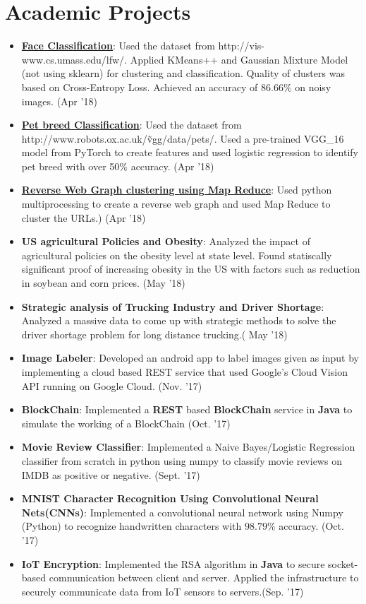 \documentclass[letterpaper,10.8pt]{article}
\newcommand{\resumeItem}[2]{
  \item\small{
    \textbf{#1}{: #2 \vspace{-2pt}}
  }
}
\newcommand{\resumeSubItem}[2]{\resumeItem{#1}{#2}\vspace{-4pt}}
\newcommand{\resumeSubHeadingListStart}{\begin{itemize}[leftmargin=*]}
\newcommand{\resumeSubHeadingListEnd}{\end{itemize}}
\begin{document}
\section{Academic Projects}
\resumeSubHeadingListStart
\resumeSubItem{\href{https://github.com/ramanujam/DataSciecne/tree/master/homework5}{Face Classification}}{Used the dataset from {http://vis-www.cs.umass.edu/lfw/}. Applied KMeans++ and Gaussian Mixture Model (not using sklearn) for clustering and classification. Quality of clusters was based on Cross-Entropy Loss. Achieved an accuracy of 86.66\% on noisy images. (Apr '18)}
\resumeSubItem{\href{https://github.com/ramanujam/DataSciecne/blob/master/homework5/deep_learning.ipynb}{Pet breed Classification}}{Used the dataset from {http://www.robots.ox.ac.uk/\~vgg/data/pets/}. Used a pre-trained VGG\_16 model from PyTorch to create features and used logistic regression to identify pet breed with over 50\% accuracy.  (Apr '18)}
\resumeSubItem{\href{https://github.com/ramanujam/DataSciecne/blob/master/homework5/map_reduce.ipynb}{Reverse Web Graph clustering using Map Reduce}}{Used python multiprocessing to create a reverse web graph and used Map Reduce to cluster the URLs.) (Apr '18)}
\resumeSubItem{US agricultural Policies and Obesity}{Analyzed the impact of agricultural policies on the obesity level at state level. Found statiscally significant proof of increasing obesity in the US with factors such as reduction in soybean and corn prices. (May '18)}
\resumeSubItem{Strategic analysis of Trucking Industry and Driver Shortage}{Analyzed a massive data to come up with strategic methods to solve the driver shortage problem for long distance trucking.( May '18)}
\resumeSubItem{Image Labeler}{Developed an android app to label images given as input by implementing a cloud based REST service that used Google's Cloud Vision API running on Google Cloud. (Nov. '17)}
\resumeSubItem{BlockChain}{Implemented a \textbf{REST} based \textbf{BlockChain} service in \textbf{Java} to simulate the working of a BlockChain (Oct. '17)}
\resumeSubItem{Movie Review Classifier}
{Implemented a Naive Bayes/Logistic Regression classifier from scratch in python using numpy to classify movie reviews on IMDB as positive or negative. (Sept. '17)}
\resumeSubItem{MNIST Character Recognition Using Convolutional Neural Nets(CNNs)}
{Implemented a convolutional neural network using Numpy (Python) to recognize handwritten characters with $98.79\%$ accuracy. (Oct. '17)}
\resumeSubItem{IoT Encryption}
{Implemented the RSA algorithm in \textbf{Java} to secure socket-based communication between client and server. Applied the infrastructure to securely communicate data from IoT sensors to servers.(Sep. '17)}
\resumeSubHeadingListEnd
\end{document}
